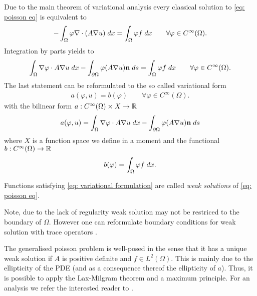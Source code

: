 Due to the main theorem of variational analysis every classical solution to \eqref{eq: poisson eq} is equivalent to 
\begin{align}
	-\int_{\Omega} {{\varphi \nabla \cdot (A \nabla u)}\;dx}=
	 \int_{\Omega} {{\varphi f}\;dx} \qquad \forall \varphi \in C^\infty(\Omega). \label{eq: variational form}
\end{align}
Integration by parts yields to
\begin{align*}
	\myIntX \Omega {\nabla \varphi  \cdot A\nabla u}
		-\myIntS  {\partial \Omega} { \varphi (A\nabla u) \mathbf{n} }
	= \myIntX  \Omega { \varphi f } \qquad \forall \varphi \in C^\infty(\Omega). %
\end{align*}
The last statement can be reformulated to the so called variational form 
\begin{align}
a(\varphi,u)  = b(\varphi) \qquad \forall \varphi \in C^\infty(\Omega). \label{eq: variational formulation}
\end{align}
with the bilinear form $a:C^\infty(\Omega) \times X \rightarrow \mathbb{R}$
\begin{align*}
a(\varphi,u) = \int_{\Omega} {{ \nabla \varphi  \cdot A\nabla u }\;dx}
	 -\int_{\partial \Omega} {{ \varphi (A\nabla u) \mathbf{n}}\;ds}
\end{align*}
where $X$ is a function space we define in a moment and the functional $b:C^\infty(\Omega) \rightarrow \mathbb{R}$
\begin{align*}
 b(\varphi)  = \int_{\Omega} {{ \varphi f}\;dx}.
\end{align*}


\begin{definition}
	Functions satisfying \eqref{eq: variational formulation} are called \emph{weak solutions} of \eqref{eq: poisson eq}.
\end{definition}
Note, due to the lack of regularity weak solution may not be restriced to the boundary of $\Omega$. However one can reformulate boundary conditions for weak solution with trace operators \cite[Section 5.5]{Evans1998}.

The generalised poisson problem is well-posed in the sense that it has a unique weak solution if $A$ is positive definite and $f\in L^2(\Omega)$. This is mainly due to the ellipticity of the PDE (and as a consequence thereof the ellipticity of $a$). Thus, it is possible to apply the Lax-Milgram theorem and a maximum principle. For an analysis we refer the interested reader to \cite[Chapter~6]{Evans1998}.


